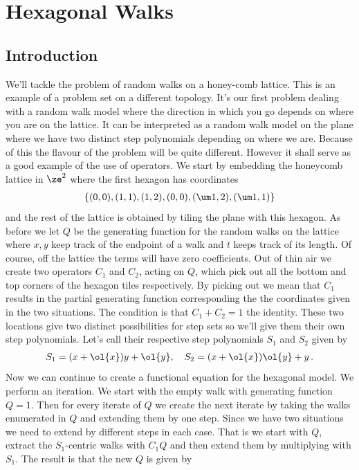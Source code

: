 
\chapter{Hexagonal Walks}
\label{ch:Hexagonal}

\section{Introduction}

We'll tackle the problem of random walks on a honey-comb lattice. This is an example of a problem set on a different topology. It's our first problem dealing with a random walk model where the direction in which you go depends on where you are on the lattice. It can be interpreted as a random walk model on the plane where we have two distinct step polynomials depending on where we are. Because of this the flavour of the problem will be quite different. However it shall serve as a good example of the use of operators. We start by embedding the honeycomb lattice in $\ze^2$ where the first hexagon has coordinates
\begin{align}
	\{(0,0),(1,1),(1,2),(0,0),(\um1,2),(\um 1,1)\}
\end{align}
and the rest of the lattice is obtained by tiling the plane with this hexagon. As before we let $Q$ be the generating function for the random walks on the lattice where $x,y$ keep track of the endpoint of a walk and $t$ keeps track of its length. Of course, off the lattice the terms will have zero coefficients. Out of thin air we create two operators $C_1$ and $C_2$, acting on $Q$, which pick out all the bottom and top corners of the hexagon tiles respectively. By picking out we mean that $C_1$ results in the partial generating function corresponding the the coordinates given in the two situations. The condition is that $C_1+C_2 = 1$ the identity. These two locations give two distinct possibilities for step sets so we'll give them their own step polynomials. Let's call their respective step polynomials $S_1$ and $S_2$ given by
\begin{align}
	S_1 = (x+\ol{x})y + \ol{y},\quad S_2 = (x+\ol{x})\ol{y}+y\,.
\end{align}
Now we can continue to create a functional equation for the hexagonal model. We perform an iteration. We start with the empty walk with generating function $Q = 1$. Then for every iterate of $Q$ we create the next iterate by taking the walks enumerated in $Q$ and extending them by one step. Since we have two situations we need to extend by different steps in each case. That is we start with $Q$, extract the $S_1$-centric walks with $C_1Q$ and then extend them by multiplying with $S_1$. The result is that the new $Q$ is given by
